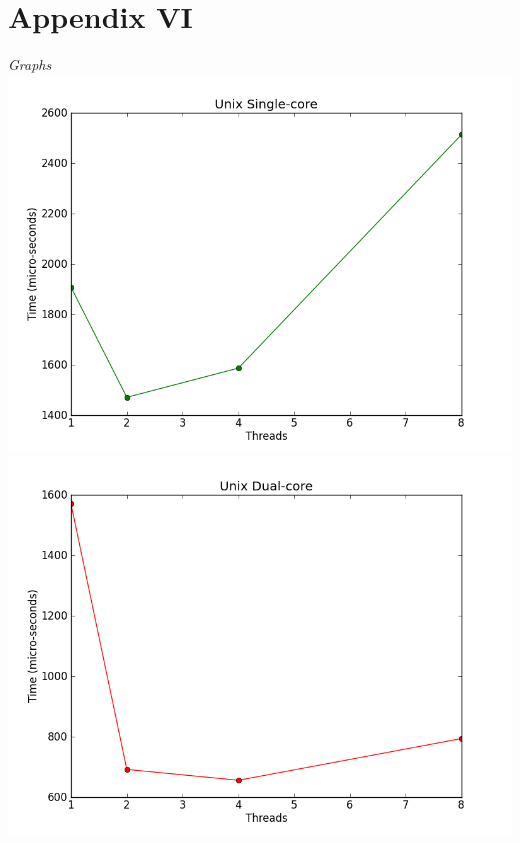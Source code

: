 \documentclass[12pt]{article}
\newcommand {\append}[2] {\section*{Appendix #1} \textsl{\large #2}}
\begin{document}
\append{VI} {Graphs}
\includegraphics[scale=0.5]{output/unix_singlecore_graph.png}
\includegraphics[scale=0.5]{output/unix_multicore_graph.png}
\end{document}
